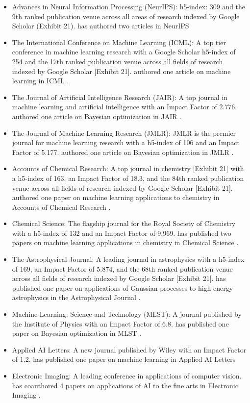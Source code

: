 \documentclass[11pt]{article}
\begin{document}
\begin{itemize}
    \item Advances in Neural Information Processing (NeurIPS): h5-index: 309 and the 9th ranked publication venue across all areas of research indexed by Google Scholar (Exhibit 21). \dr has authored two articles in NeurIPS \cite{cv, gauche, chatgpt}
    \item The International Conference on Machine Learning (ICML): A top tier conference in machine learning research with a Google Scholar h5-index of 254 and the 17th ranked publication venue across all fields of research indexed by Google Scholar [Exhibit 21]. \dr authored one article on machine learning in ICML \cite{sensors}.
    \item The Journal of Artificial Intelligence Research (JAIR): A top journal in machine learning and artificial intelligence with an Impact Factor of 2.776. \dr authored one article on Bayesian optimization in JAIR \cite{cv, hebo}.
    \item The Journal of Machine Learning Research (JMLR): JMLR is the premier journal for machine learning research with a h5-index of 106 and an Impact Factor of 5.177. \dr authored one article on Bayesian optimization in JMLR \cite{cv, forget}.
    \item Accounts of Chemical Research: A top journal in chemistry [Exhibit 21] with a h5-index of 163, an Impact Factor of 18.3, and the 84th ranked publication venue across all fields of research indexed by Google Scholar [Exhibit 21]. \dr authored one paper on machine learning applications to chemistry in Accounts of Chemical Research \cite{cv, mapping}.    
    \item Chemical Science: The flagship journal for the Royal Society of Chemistry with a h5-index of 132 and an Impact Factor of 9.969. \dr has published two papers on machine learning applications in chemistry in Chemical Science \cite{cv, photo}.
    \item The Astrophysical Journal: A leading journal in astrophysics with a h5-index of 169, an Impact Factor of 5.874, and the 68th ranked publication venue across all fields of research indexed by Google Scholar [Exhibit 21]. \dr has published one paper on applications of Gaussian processes to high-energy astrophysics in the Astrophysical Journal \cite{cv, mrk}.
    \item Machine Learning: Science and Technology (MLST): A journal published by the Institute of Physics with an Impact Factor of 6.8. \dr has published one paper on Bayesian optimization in MLST \cite{cv, achieving}.
    \item Applied AI Letters: A new journal published by Wiley with an Impact Factor of 1.2. \dr has published one paper on machine learning in Applied AI Letters \cite{cv, bourached}
    \item Electronic Imaging: A leading conference in applications of computer vision. \dr has coauthored 4 papers on applications of AI to the fine arts in Electronic Imaging \cite{cv, raiders, greg, saints, res}.
\end{itemize}
\end{document}
